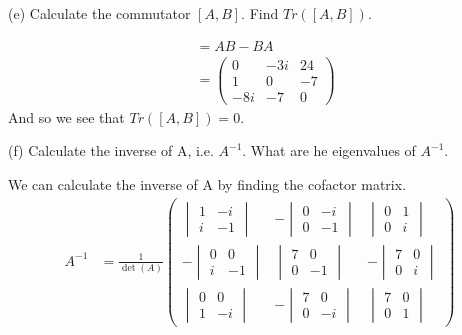 \documentclass[a4paper, 11pt]{article}
\newenvironment{solution}{%
	\begin{list}{}{%
			\setlength{\topsep}{0pt}%
			\setlength{\leftmargin}{1.5cm}%
			\setlength{\rightmargin}{1.5cm}%
			\setlength{\listparindent}{\parindent}%
			\setlength{\itemindent}{\parindent}%
			\setlength{\parsep}{\parskip}%
	}%
	\item[]}{\end{list}}
\begin{document}
\noindent(e) Calculate the commutator $[A,B]$. Find $Tr([A,B])$. 
	\begin{solution}
			\begin{align*}
				[A, B] &= AB-BA \\ 
					&= \begin{pmatrix}0 & -3i & 24 \\ 1 & 0 & -7 \\ -8i & -7 & 0\end{pmatrix}
			\end{align*}
			\noindent And so we see that $Tr([A,B]) = 0$. \\
	\end{solution}

\noindent(f) Calculate the inverse of A, i.e. $A^{-1}$. What are he eigenvalues of $A^{-1}$. 
	\begin{solution}
		We can calculate the inverse of A by finding the cofactor matrix. 
		\begin{align*}
			A^{-1} &= \frac{1}{\det(A)}\begin{pmatrix}
				\begin{vmatrix} 1 & -i \\ i & -1\end{vmatrix} & -\begin{vmatrix} 0 & -i \\ 0 & -1\end{vmatrix} & \begin{vmatrix} 0 & 1 \\ 0 & i\end{vmatrix} \\ 
				-\begin{vmatrix} 0 & 0 \\ i & -1\end{vmatrix} & \begin{vmatrix} 7 & 0 \\ 0 & -1\end{vmatrix} & -\begin{vmatrix} 7 &  0 \\ 0 & i\end{vmatrix} \\ 	
				\begin{vmatrix} 0 & 0 \\ 1 & -i\end{vmatrix} & -\begin{vmatrix} 7 & 0 \\ 0 & -i\end{vmatrix} & \begin{vmatrix} 7 & 0\\ 0 & 1\end{vmatrix} 

\end{pmatrix}
\end{align*}
\end{solution}
\end{document}
